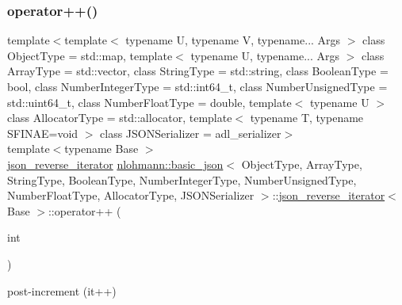 \subsubsection{\texorpdfstring{operator++()}{operator++()}\hspace{0.1cm}{\footnotesize\ttfamily [1/2]}}
{\footnotesize\ttfamily template$<$template$<$ typename U, typename V, typename... Args $>$ class Object\+Type = std\+::map, template$<$ typename U, typename... Args $>$ class Array\+Type = std\+::vector, class String\+Type  = std\+::string, class Boolean\+Type  = bool, class Number\+Integer\+Type  = std\+::int64\+\_\+t, class Number\+Unsigned\+Type  = std\+::uint64\+\_\+t, class Number\+Float\+Type  = double, template$<$ typename U $>$ class Allocator\+Type = std\+::allocator, template$<$ typename T, typename S\+F\+I\+N\+A\+E=void $>$ class J\+S\+O\+N\+Serializer = adl\+\_\+serializer$>$ \\
template$<$typename Base $>$ \\
\hyperlink{classnlohmann_1_1basic__json_1_1json__reverse__iterator}{json\+\_\+reverse\+\_\+iterator} \hyperlink{classnlohmann_1_1basic__json}{nlohmann\+::basic\+\_\+json}$<$ Object\+Type, Array\+Type, String\+Type, Boolean\+Type, Number\+Integer\+Type, Number\+Unsigned\+Type, Number\+Float\+Type, Allocator\+Type, J\+S\+O\+N\+Serializer $>$\+::\hyperlink{classnlohmann_1_1basic__json_1_1json__reverse__iterator}{json\+\_\+reverse\+\_\+iterator}$<$ Base $>$\+::operator++ (\begin{DoxyParamCaption}\item[{int}]{ }\end{DoxyParamCaption})\hspace{0.3cm}{\ttfamily [inline]}}



post-\/increment (it++) 

\mbox{\label{classnlohmann_1_1basic__json_1_1json__reverse__iterator_aa10b55b0c57a849cfe0cba15e7818e97}} 
